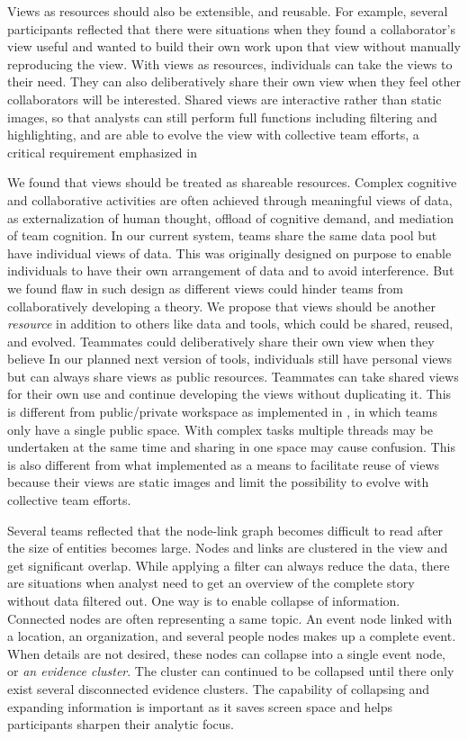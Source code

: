 Views as resources should also be extensible, and reusable. For example, several participants reflected that there were situations when they found a collaborator's view useful and wanted to build their own work upon that view without manually reproducing the view. With views as resources, individuals can take the views to their need. They can also deliberatively share their own view when they feel other collaborators will be interested. Shared views are interactive rather than static images, so that analysts can still perform full functions including filtering and highlighting, and are able to evolve the view with collective team efforts, a critical requirement emphasized in \cite{Carroll2013}


We found that views should be treated as shareable resources. Complex cognitive and collaborative activities are often achieved through meaningful views of data, as externalization of human thought, offload of cognitive demand, and mediation of team cognition. In our current system, teams share the same data pool but have individual views of data. This was originally designed on purpose to enable individuals to have their own arrangement of data and to avoid interference. But we found flaw in such design as different views could hinder teams from collaboratively developing a theory. We propose that views should be another \emph{resource} in addition to others like data and tools, which could be shared, reused, and evolved. Teammates could deliberatively share their own view when they believe In our planned next version of tools, individuals still have personal views but can always share views as public resources. Teammates can take shared views for their own use and continue developing the views without duplicating it. This is different from public/private workspace as implemented in \cite{Convertino2011}, in which teams only have a single public space. With complex tasks multiple threads may be undertaken at the same time and sharing in one space may cause confusion. This is also different from what \cite{Nobarany2012} implemented as a means to facilitate reuse of views because their views are static images and limit the possibility to evolve with collective team efforts.


Several teams reflected that the node-link graph becomes difficult to read after the size of entities becomes large. Nodes and links are clustered in the view and get significant overlap. While applying a filter can always reduce the data, there are situations when analyst need to get an overview of the complete story without data filtered out. One way is to enable collapse of information. Connected nodes are often representing a same topic. An event node linked with a location, an organization, and several people nodes makes up a complete event. When details are not desired, these nodes can collapse into a single event node, or \emph{an evidence cluster}. The cluster can continued to be collapsed until there only exist several disconnected evidence clusters. The capability of collapsing and expanding information is important as it saves screen space and helps participants sharpen their analytic focus.



